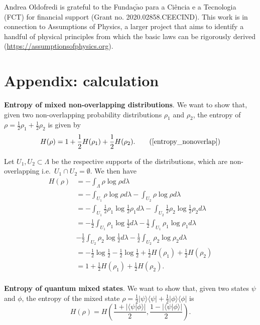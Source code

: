 \documentclass[10pt,twocolumn, nofootinbib]{revtex4-2}
\begin{document}
Andrea Oldofredi is grateful to the Funda\c{c}$\tilde{\mathrm{a}}$o para a Ci\^encia e a Tecnologia (FCT) for financial support (Grant no. 2020.02858.CEECIND).  This work is in connection to Assumptions of Physics, a larger project that aims to identify a handful of physical principles from which the basic laws can be rigorously derived  (\url{https://assumptionsofphysics.org}).

%

\clearpage

\section*{Appendix: calculation}
\label{A}
\textbf{Entropy of mixed non-overlapping distributions}. We want to show that, given two non-overlapping probability distributions $\rho_1$ and $\rho_2$, the entropy of $\rho = \frac{1}{2} \rho_1 + \frac{1}{2} \rho_2$ is given by
\begin{equation}
	H(\rho) = 1 + \frac{1}{2} H(\rho_1) + \frac{1}{2} H(\rho_2). \tag{\ref{entropy_nonoverlap}}
\end{equation}

Let $U_1, U_2 \subset \Lambda$ be the respective supports of the distributions, which are non-overlapping i.e.\ $U_1 \cap U_2 = \emptyset$. We then have
\begin{align*}
	H(\rho) &= - \int_\Lambda \rho \log \rho d\lambda \\
	&= -\int_{U_1} \rho \log \rho d\lambda -\int_{U_2} \rho \log \rho d\lambda \\
	&= -\int_{U_1} \frac{1}{2} \rho_1 \log \frac{1}{2} \rho_1 d\lambda -\int_{U_2} \frac{1}{2} \rho_2 \log \frac{1}{2} \rho_2 d\lambda \\
	&= - \frac{1}{2} \int_{U_1} \rho_1 \log \frac{1}{2} d\lambda - \frac{1}{2} \int_{U_1} \rho_1 \log \rho_1 d\lambda \\
	&- \frac{1}{2} \int_{U_2} \rho_2 \log \frac{1}{2} d\lambda - \frac{1}{2} \int_{U_2} \rho_2 \log \rho_2 d\lambda \\
	&= - \frac{1}{2} \log \frac{1}{2} - \frac{1}{2} \log \frac{1}{2} + \frac{1}{2} H(\rho_1) + \frac{1}{2} H(\rho_2) \\
	&= 1 + \frac{1}{2} H(\rho_1) + \frac{1}{2} H(\rho_2). \\
\end{align*}


\textbf{Entropy of quantum mixed states}. We want to show that, given two states $\psi$ and $\phi$, the entropy of the mixed state $\rho = \frac{1}{2}|\psi\rangle\langle\psi| + \frac{1}{2}|\phi\rangle\langle\phi|$ is
\begin{equation}\label{entropy}
	H(\rho) = H\left(\frac{1+|\langle\psi|\phi\rangle|}{2}, \frac{1-|\langle\psi|\phi\rangle|}{2}\right).
\end{equation}
\end{document}
